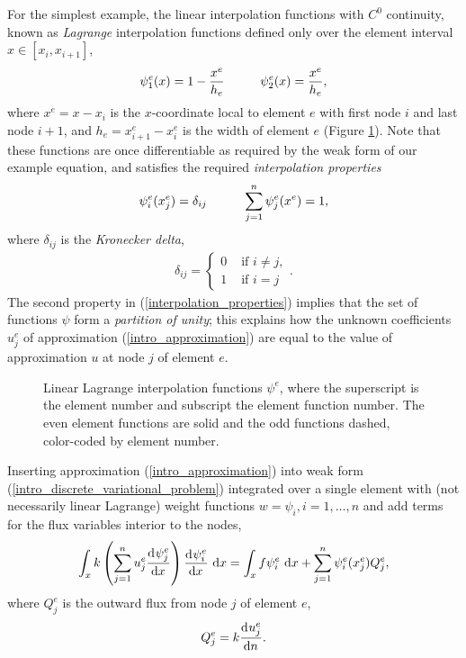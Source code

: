 For the simplest example, the linear interpolation functions with $C^0$ continuity, known as  \emph{Lagrange} interpolation functions defined only over the element interval $x \in [x_i, x_{i+1}]$,
\begin{align}
  \label{linear_lagrange_functions}
  \psi_1^e(x) = 1 - \frac{x^e}{h_e} \hspace{10mm} \psi_2^e(x) = \frac{x^e}{h_e},
\end{align}
where $x^e = x - x_i$ is the $x$-coordinate local to element $e$ with first node $i$ and last node $i+1$, and $h_e = x_{i+1}^e - x_i^e$ is the width of element $e$ (Figure \ref{lagrange_ftns_image}).  Note that these functions are once differentiable as required by the weak form of our example equation, and satisfies the required  \emph{interpolation properties}
\begin{align}
  \label{interpolation_properties}
  \psi_i^e(x_j^e) = \delta_{ij} \hspace{10mm} \sum_{j=1}^n \psi_j^e(x^e) = 1,
\end{align}
where $\delta_{ij}$ is the  \emph{Kronecker delta},
\begin{align*}
  \delta_{ij} = \begin{cases}
                  0 & \text{ if } i \neq j,\\
                  1 & \text{ if } i = j
                \end{cases}.
\end{align*}
The second property in (\ref{interpolation_properties}) implies that the set of functions $\psi$ form a \emph{partition of unity}; this explains how the unknown coefficients $u_j^e$ of approximation (\ref{intro_approximation}) are equal to the value of approximation $u$ at node $j$ of element $e$.

\begin{figure}
  \centering
    \def\svgwidth{\linewidth}
    
  \caption[linear Lagrange shape functions]{Linear Lagrange interpolation functions $\psi^e$, where the superscript is the element number and subscript the element function number.  The even element functions are solid and the odd functions dashed, color-coded by element number.}
    \label{lagrange_ftns_image}
\end{figure}

Inserting approximation (\ref{intro_approximation}) into weak form (\ref{intro_discrete_variational_problem}) integrated over a single element with (not necessarily linear Lagrange) weight functions $w = \psi_i, i = 1,\ldots,n$ and add terms for the flux variables interior to the nodes,
\begin{align}
  \label{intro_element_form}
  \int_x k \left( \sum_{j=1}^n u_j^e \frac{\mathrm{d}^{} \psi_j^e}{\mathrm{d} x^{} } \right) \frac{\mathrm{d}^{} \psi_i^e}{\mathrm{d} x^{} } \ \mathrm{d}x = \int_x f \psi_i^e \ \mathrm{d}x + \sum_{j=1}^n \psi_i^e(x_j^e) Q_j^e,
\end{align}
where $Q_j^e$ is the outward flux from node $j$ of element $e$,
\begin{align*}
  Q_j^e = k \frac{\mathrm{d}^{} u_j^e}{\mathrm{d} n^{} }.
\end{align*}

